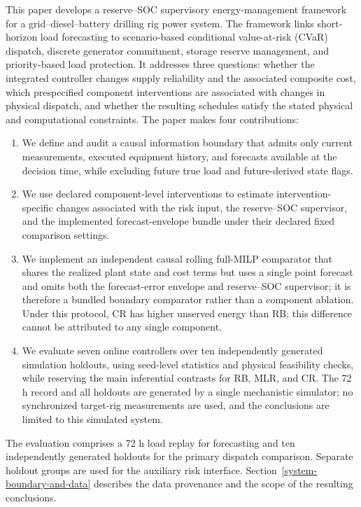 This paper develops a reserve--SOC supervisory energy-management framework
for a grid--diesel--battery drilling rig power system. The framework links
short-horizon load forecasting to scenario-based conditional value-at-risk
(CVaR) dispatch, discrete generator commitment, storage reserve management,
and priority-based load protection. It addresses three questions: whether the
integrated controller changes supply reliability and the associated composite
cost, which prespecified component interventions are associated with changes in
physical dispatch, and whether the resulting schedules satisfy the stated
physical and computational constraints. The
paper makes four contributions:

\begin{enumerate}
\def\labelenumi{\arabic{enumi}.}
\tightlist
\item
  We define and audit a causal information boundary that admits only current
  measurements, executed equipment history, and forecasts available at the
  decision time, while excluding future true load and future-derived state
  flags.
\item
  We use declared component-level interventions to estimate
  intervention-specific changes associated with the risk input, the
  reserve--SOC supervisor, and the implemented forecast-envelope bundle under
  their declared fixed comparison settings.
\item
  We implement an independent causal rolling full-MILP comparator that shares
  the realized plant state and cost terms but uses a single point forecast and
  omits both the forecast-error envelope and reserve--SOC supervisor; it is
  therefore a bundled boundary comparator rather than a component ablation.
  Under this protocol, CR has higher unserved energy than RB; this difference
  cannot be attributed to any single component.
\item
  We evaluate seven online controllers over ten independently generated
  simulation holdouts, using seed-level statistics and physical feasibility
  checks, while reserving the main inferential contrasts for RB, MLR, and CR.
  The 72 h record and all holdouts are generated by a single mechanistic
  simulator; no synchronized target-rig measurements are used, and the
  conclusions are limited to this simulated system.
\end{enumerate}

The evaluation comprises a 72 h load replay for forecasting and ten
independently generated holdouts for the primary dispatch comparison. Separate
holdout groups are used for the auxiliary risk interface.
Section~\ref{system-boundary-and-data} describes the data provenance and the
scope of the resulting conclusions.

